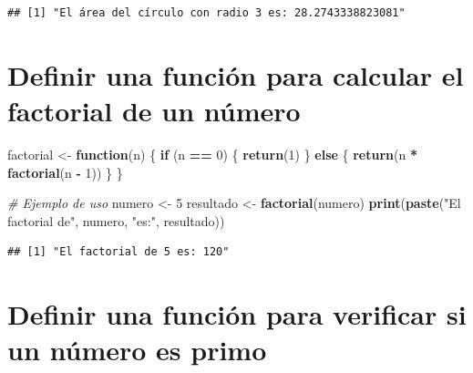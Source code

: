\documentclass[
]{book}
\newenvironment{Shaded}{\begin{snugshade}}{\end{snugshade}}
\newcommand{\CommentTok}[1]{\textcolor[rgb]{0.56,0.35,0.01}{\textit{#1}}}
\newcommand{\ControlFlowTok}[1]{\textcolor[rgb]{0.13,0.29,0.53}{\textbf{#1}}}
\newcommand{\DecValTok}[1]{\textcolor[rgb]{0.00,0.00,0.81}{#1}}
\newcommand{\FunctionTok}[1]{\textcolor[rgb]{0.13,0.29,0.53}{\textbf{#1}}}
\newcommand{\NormalTok}[1]{#1}
\newcommand{\OtherTok}[1]{\textcolor[rgb]{0.56,0.35,0.01}{#1}}
\newcommand{\SpecialCharTok}[1]{\textcolor[rgb]{0.81,0.36,0.00}{\textbf{#1}}}
\newcommand{\StringTok}[1]{\textcolor[rgb]{0.31,0.60,0.02}{#1}}
\begin{document}
\begin{verbatim}
## [1] "El área del círculo con radio 3 es: 28.2743338823081"
\end{verbatim}

\section{Definir una función para calcular el factorial de un número}\label{definir-una-funciuxf3n-para-calcular-el-factorial-de-un-nuxfamero}

\begin{Shaded}
\begin{Highlighting}[]
\NormalTok{factorial }\OtherTok{\textless{}{-}} \ControlFlowTok{function}\NormalTok{(n) \{}
  \ControlFlowTok{if}\NormalTok{ (n }\SpecialCharTok{==} \DecValTok{0}\NormalTok{) \{}
    \FunctionTok{return}\NormalTok{(}\DecValTok{1}\NormalTok{)}
\NormalTok{  \} }\ControlFlowTok{else}\NormalTok{ \{}
    \FunctionTok{return}\NormalTok{(n }\SpecialCharTok{*} \FunctionTok{factorial}\NormalTok{(n }\SpecialCharTok{{-}} \DecValTok{1}\NormalTok{))}
\NormalTok{  \}}
\NormalTok{\}}

\CommentTok{\# Ejemplo de uso}
\NormalTok{numero }\OtherTok{\textless{}{-}} \DecValTok{5}
\NormalTok{resultado }\OtherTok{\textless{}{-}} \FunctionTok{factorial}\NormalTok{(numero)}
\FunctionTok{print}\NormalTok{(}\FunctionTok{paste}\NormalTok{(}\StringTok{"El factorial de"}\NormalTok{, numero, }\StringTok{"es:"}\NormalTok{, resultado))}
\end{Highlighting}
\end{Shaded}

\begin{verbatim}
## [1] "El factorial de 5 es: 120"
\end{verbatim}

\section{Definir una función para verificar si un número es primo}\label{definir-una-funciuxf3n-para-verificar-si-un-nuxfamero-es-primo}
\end{document}
